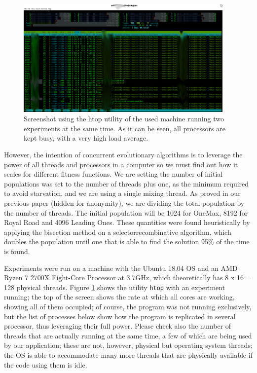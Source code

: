 \documentclass[sigconf]{acmart}\usepackage[]{graphicx}\usepackage[]{color}
\begin{document}
\begin{figure}[h!tb]
  \centering
\includegraphics[width=0.95\textwidth]{../figure/screenshot}
\caption{Screenshot using the htop utility of the used machine running
  two experiments at the same time. As it can be seen, all processors
  are kept busy, with a very high load average. }
\label{fig:screenshot}
\end{figure}
%
However, the intention of concurrent evolutionary algorithms is to
leverage the power of all threads and processors in a computer so we must find out how it scales for different fitness functions. We are setting the number of initial populations was set to the
number of threads plus one, as the minimum required to avoid
starvation, and we are using a single mixing thread. As proved in our previous paper (hidden for anonymity), we are dividing the total population by the number of threads. The initial population will be 1024 for OneMax, 8192 for Royal Road and 4096 Leading Ones. These quantities were found heuristically by applying the bisection method on a selectorrecombinative algorithm, which doubles the population until one that is able to find the solution 95\% of the time is found.

Experiments were run on a machine with the
Ubuntu 18.04 OS and an AMD Ryzen 7 2700X Eight-Core Processor
at 3.7GHz, which theoretically has 8 x 16 = 128 physical
threads. Figure \ref{fig:screenshot} shows the utility  {\tt htop} with an 
experiment running; the top of the screen shows the rate at which all
cores are working, showing all of them occupied; of course, the
program was not running exclusively, but the list of processes below
show how the program is replicated in several processor, thus
leveraging their full power. Please check also the number of threads
that are actually running at the same time, a few of which are being used by our application; these are not, however, physical but operating system threads; the OS is able to accommodate many more threads that are physically available if the code using them is idle. 
\end{document}
